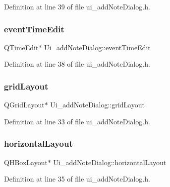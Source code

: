 Definition at line 39 of file ui\+\_\+add\+Note\+Dialog.\+h.

\hypertarget{classUi__addNoteDialog_a6c1f24a74ed0a88961136db719c3ae4e}{}\label{classUi__addNoteDialog_a6c1f24a74ed0a88961136db719c3ae4e} 
\subsubsection{\texorpdfstring{event\+Time\+Edit}{eventTimeEdit}}
{\footnotesize\ttfamily Q\+Time\+Edit$\ast$ Ui\+\_\+add\+Note\+Dialog\+::event\+Time\+Edit}



Definition at line 38 of file ui\+\_\+add\+Note\+Dialog.\+h.

\hypertarget{classUi__addNoteDialog_a8e3a587de2697e28e5c06232ae12a27f}{}\label{classUi__addNoteDialog_a8e3a587de2697e28e5c06232ae12a27f} 
\subsubsection{\texorpdfstring{grid\+Layout}{gridLayout}}
{\footnotesize\ttfamily Q\+Grid\+Layout$\ast$ Ui\+\_\+add\+Note\+Dialog\+::grid\+Layout}



Definition at line 33 of file ui\+\_\+add\+Note\+Dialog.\+h.

\hypertarget{classUi__addNoteDialog_aee7483b969d780e610d025a38849298c}{}\label{classUi__addNoteDialog_aee7483b969d780e610d025a38849298c} 
\subsubsection{\texorpdfstring{horizontal\+Layout}{horizontalLayout}}
{\footnotesize\ttfamily Q\+H\+Box\+Layout$\ast$ Ui\+\_\+add\+Note\+Dialog\+::horizontal\+Layout}



Definition at line 35 of file ui\+\_\+add\+Note\+Dialog.\+h.

